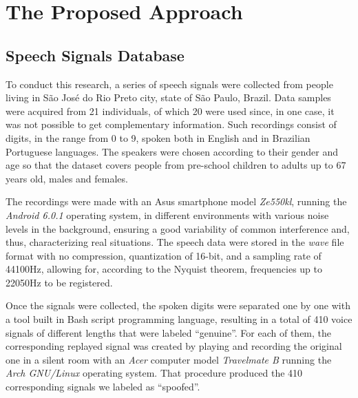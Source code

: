\section{The Proposed Approach}
\label{sec:propApproach}
\subsection{Speech Signals Database}
\par To conduct this research, a series of speech signals were collected from people living in São José do Rio Preto city, state of São Paulo, Brazil. Data samples were acquired from 21 individuals, of which 20 were used since, in one case, it was not possible to get complementary information. Such recordings consist of digits, in the range from 0 to 9, spoken both in English and in Brazilian Portuguese languages. The speakers were chosen according to their gender and age so that the dataset covers people from pre-school children to adults up to 67 years old, males and females.
\\
\par The recordings were made with an Asus smartphone model \textit{Ze550kl}, running the \textit{Android 6.0.1} operating system, in different environments with various noise levels in the background, ensuring a good variability of common interference and, thus, characterizing real situations. The speech data were stored in the \textit{wave} file format with no compression, quantization of 16-bit, and a sampling rate of 44100Hz, allowing for, according to the Nyquist theorem, frequencies up to 22050Hz to be registered.
\\
\par Once the signals were collected, the spoken digits were separated one by one with a tool built in Bash script programming language, resulting in a total of 410 voice signals of different lengths that were labeled ``genuine''. For each of them, the corresponding replayed signal was created by playing and recording the original one in a silent room with an \textit{Acer} computer model \textit{Travelmate B} running the \textit{Arch GNU/Linux} operating system. That procedure produced the 410 corresponding signals we labeled as ``spoofed''.

